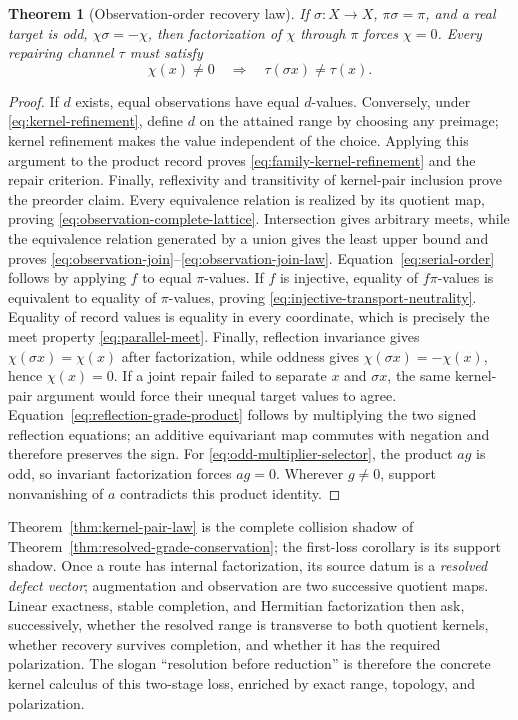 \documentclass[11pt]{article}
\newtheorem{theorem}{Theorem}[section]
\theoremstyle{definition}
\theoremstyle{remark}
\begin{document}
\begin{theorem}[Observation-order recovery law]
If \(\sigma:X\to X\), \(\pi\sigma=\pi\), and a real target is odd,
\(\chi\sigma=-\chi\), then factorization of \(\chi\) through \(\pi\)
forces \(\chi=0\).  Every repairing channel \(\tau\) must satisfy
\[
                \chi(x)\ne0\quad\Longrightarrow\quad
                \tau(\sigma x)\ne\tau(x).
\tag{2.K4}\label{eq:orientation-before-completion}
\]
\end{theorem}

\begin{proof}
If \(d\) exists, equal observations have equal \(d\)-values.  Conversely,
under \eqref{eq:kernel-refinement}, define \(d\) on the attained range by
choosing any preimage; kernel refinement makes the value independent of the
choice.  Applying this argument to the product record proves
\eqref{eq:family-kernel-refinement} and the repair criterion.  Finally,
reflexivity and transitivity of kernel-pair inclusion prove the preorder
claim.  Every equivalence relation is realized by its quotient map, proving
\eqref{eq:observation-complete-lattice}.  Intersection gives arbitrary
meets, while the equivalence relation generated by a union gives the least
upper bound and proves
\eqref{eq:observation-join}--\eqref{eq:observation-join-law}.
Equation~\eqref{eq:serial-order} follows by applying \(f\) to equal
\(\pi\)-values.  If \(f\) is injective, equality of \(f\pi\)-values is
equivalent to equality of \(\pi\)-values, proving
\eqref{eq:injective-transport-neutrality}.  Equality of record values is equality in every coordinate,
which is precisely the meet property \eqref{eq:parallel-meet}.
Finally,
reflection invariance gives \(\chi(\sigma x)=\chi(x)\) after factorization,
while oddness gives \(\chi(\sigma x)=-\chi(x)\), hence \(\chi(x)=0\).
If a joint repair failed to separate \(x\) and \(\sigma x\), the same
kernel-pair argument would force their unequal target values to agree.
Equation~\eqref{eq:reflection-grade-product} follows by multiplying the two
signed reflection equations; an additive equivariant map commutes with
negation and therefore preserves the sign.  For
\eqref{eq:odd-multiplier-selector}, the product \(ag\) is odd, so invariant
factorization forces \(ag=0\).  Wherever \(g\ne0\), support nonvanishing of
\(a\) contradicts this product identity.
\end{proof}

Theorem~\ref{thm:kernel-pair-law} is the complete collision shadow of
Theorem~\ref{thm:resolved-grade-conservation}; the first-loss corollary is
its support shadow.  Once a route has internal factorization, its source datum
is a \emph{resolved defect vector}; augmentation and observation are two
successive quotient maps.  Linear exactness, stable completion, and
Hermitian factorization then ask, successively, whether the resolved range
is transverse to both quotient kernels, whether recovery survives
completion, and whether it has the required polarization.  The slogan
``resolution before reduction'' is therefore the concrete kernel calculus
of this two-stage loss, enriched by exact range, topology, and polarization.
\end{document}

